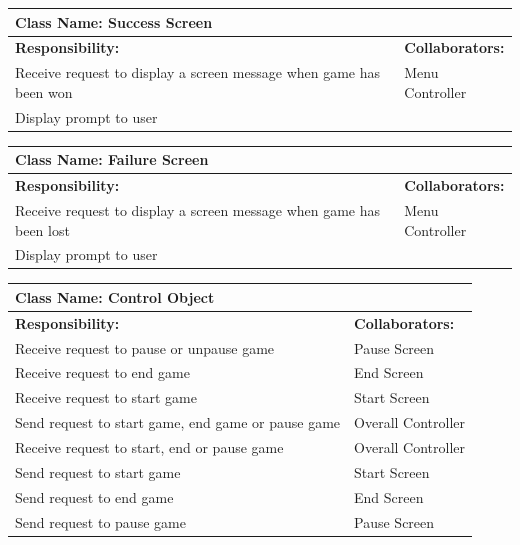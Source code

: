 \documentclass[12pt, titlepage]{article}
\begin{document}
\begin{enumerate}[a)]
	\begin{table}[H]
		\centering
		\begin{tabular}{|p{10cm}|p{5cm}|}
		\hline 
		 \multicolumn{2}{|l|}{\textbf{Class Name: Success Screen}} \\
		\hline
		\textbf{Responsibility:} & \textbf{Collaborators:} \\
		\hline
		 Receive request to display a screen message when game has been won& Menu Controller \\
		\hline
		 Display prompt to user& \\
		\hline
		\end{tabular}
	\end{table}
	
	\begin{table}[H]
		\centering
		\begin{tabular}{|p{10cm}|p{5cm}|}
		\hline 
		 \multicolumn{2}{|l|}{\textbf{Class Name: Failure Screen}} \\
		\hline
		\textbf{Responsibility:} & \textbf{Collaborators:} \\
		\hline
		 Receive request to display a screen message when game has been lost& Menu Controller \\
		\hline
		 Display prompt to user& \\
		\hline
		\end{tabular}
	\end{table}	
	
	\begin{table}[H]
		\centering
		\begin{tabular}{|p{10cm}|p{5cm}|}
		\hline 
		 \multicolumn{2}{|l|}{\textbf{Class Name: Control Object}} \\
		\hline
		\textbf{Responsibility:} & \textbf{Collaborators:} \\
		\hline
		 Receive request to pause or unpause game & Pause Screen\\
		\hline
		 Receive request to end game & End Screen\\
		\hline
		 Receive request to start game & Start Screen\\
		\hline
		Send request to start game, end game or pause game & Overall Controller\\
		\hline
		Receive request to start, end or pause game & Overall Controller\\
		\hline
		Send request to start game & Start Screen\\
		\hline
		Send request to end game & End Screen\\
		\hline
		Send request to pause game & Pause Screen\\
		\hline
		\end{tabular}
	\end{table}


\end{enumerate}
\end{document}
